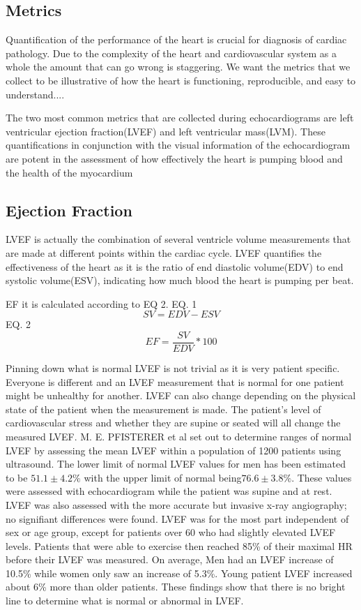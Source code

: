 \documentclass[12pt]{article}
\begin{document}
\subsection{Metrics}
Quantification of the performance of the heart is crucial for diagnosis of cardiac pathology.
Due to the complexity of the heart and cardiovascular system as a whole the amount that can go wrong is staggering.
We want the metrics that we collect to be illustrative of how the heart is functioning,
reproducible,
and easy to understand....%

The two most common metrics that are collected during echocardiograms are left ventricular ejection fraction(LVEF) and left ventricular mass(LVM).\cite{ase_chamber_quant_update}
These quantifications in conjunction with the visual information of the echocardiogram are potent in the assessment of how effectively the heart is pumping blood and the health of the myocardium

\subsection{Ejection Fraction}
LVEF is actually the combination of several ventricle volume measurements that are made at different points within the cardiac cycle.
LVEF quantifies the effectiveness of the heart as it is the ratio of end diastolic volume(EDV) to end systolic volume(ESV), indicating how much blood the heart is pumping per beat.

EF it is calculated according to EQ 2.
EQ. 1
\[SV = EDV - ESV\]
EQ. 2
\[EF = \frac{SV}{EDV} * 100   \]  

Pinning down what is normal LVEF is not trivial as it is very patient specific.
Everyone is different and an LVEF measurement that is normal for one patient might be unhealthy for another.
LVEF can also change depending on the physical state of the patient when the measurement is made.
The patient's level of cardiovascular stress and whether they are supine or seated will all change the measured LVEF.
M. E. PFISTERER et al set out to determine ranges of normal LVEF by assessing the mean LVEF within a population of 1200 patients using ultrasound.
The lower limit of normal LVEF values for men has been estimated to be $ 51.1 \pm 4.2\%$ with the upper limit of normal being$ 76.6 \pm 3.8\%$.
These values were assessed with echocardiogram while the patient was supine and at rest.
LVEF was also assessed with the more accurate but invasive x-ray angiography; no signifiant differences were found.
LVEF was for the most part independent of sex or age group, except for patients over 60 who had slightly elevated LVEF levels.
Patients that were able to exercise then reached 85\% of their maximal HR before their LVEF was measured.
On average, Men had an LVEF increase of 10.5\% while women only saw an increase of 5.3\%.
Young patient LVEF increased about 6\% more than older patients\cite{norm_EF_values}.
These findings show that there is no bright line to determine what is normal or abnormal in LVEF.
\end{document}
